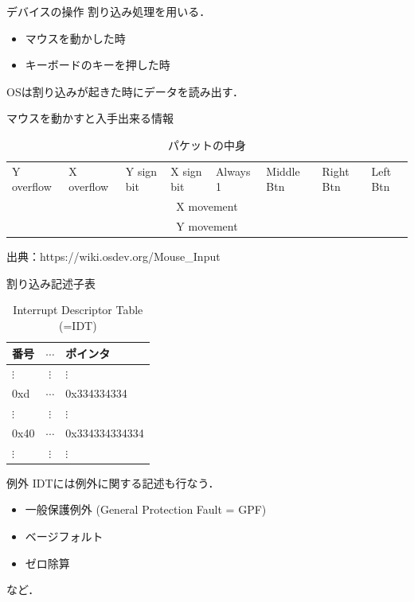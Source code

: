 \documentclass[titlepage,dvipdfmx,uplatex,a4j,12pt]{beamer}
\begin{document}
\begin{frame}{デバイスの操作}
    割り込み処理を用いる．

    \begin{itemize}
        \item マウスを動かした時
        \item キーボードのキーを押した時
    \end{itemize}

    OSは割り込みが起きた時にデータを読み出す．
\end{frame}

\begin{frame}{マウスを動かすと入手出来る情報}
    \begin{table}[h]
        \tiny
        \caption{パケットの中身}
        \centering
        \begin{tabular}{llllllll}
            \toprule
            Y overflow & X overflow & Y sign bit & X sign bit & Always 1 & Middle Btn & Right Btn & Left Btn \\
            \multicolumn{8}{c}{X movement}  \\
            \multicolumn{8}{c}{Y movement}
            \\ \bottomrule
        \end{tabular}
    \end{table}
    出典：https://wiki.osdev.org/Mouse\_Input
\end{frame}

\begin{frame}{割り込み記述子表}
    \begin{table}[h]
        \caption{Interrupt Descriptor Table (=IDT)}
        \centering
        \begin{tabular}{lcl}
            \toprule
            番号 & $\cdots$ & ポインタ\\ \midrule
            $\vdots$ & $\vdots$ & $\vdots$ \\
            0xd & $\cdots$ & 0x334334334  \\
            $\vdots$ & $\vdots$ & $\vdots$ \\
            0x40 & $\cdots$ & 0x334334334334    \\
            $\vdots$ & $\vdots$ & $\vdots$ \\   \bottomrule
        \end{tabular}
    \end{table}
\end{frame}

\begin{frame}{例外}
    IDTには例外に関する記述も行なう．
    \begin{itemize}
        \item 一般保護例外 (General Protection Fault = GPF)
        \item ベージフォルト
        \item ゼロ除算
    \end{itemize}
    など．
\end{frame}
\end{document}

